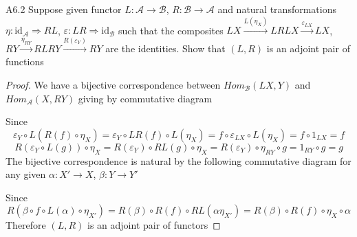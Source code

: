 \documentclass[../main.tex]{subfiles}
\begin{document}
\begin{customexercise}{A6.2}
Suppose given functor $L:\mathcal{A}\to\mathcal{B}$, $R:\mathcal{B}\to\mathcal{A}$ and natural transformations $\eta:\mathrm{id}_{\mathcal A}\Rightarrow RL$, $\varepsilon:LR\Rightarrow\mathrm{id}_{\mathcal B}$ such that the composites $LX\xrightarrow{L(\eta_X)}LRLX\xrightarrow{\varepsilon_{LX}}LX$, $RY\xrightarrow{\eta_{RY}}RLRY\xrightarrow{R(\varepsilon_Y)}RY$ are the identities. Show that $(L,R)$ is an adjoint pair of functions
\end{customexercise}

\begin{proof}
We have a bijective correspondence between $Hom_{\mathscr B}(LX,Y)$ and $Hom_{\mathscr A}(X,RY)$ giving by commutative diagram
\begin{center}
\end{center}
Since
\[\varepsilon_Y\circ L(R(f)\circ\eta_X)=\varepsilon_Y\circ LR(f)\circ L(\eta_X)=f\circ\varepsilon_{LX}\circ L(\eta_X)=f\circ1_{LX}=f\]
\[R(\varepsilon_Y\circ L(g))\circ\eta_X=R(\varepsilon_Y)\circ RL(g)\circ\eta_X=R(\varepsilon_Y)\circ\eta_{RY}\circ g=1_{RY}\circ g=g\]
The bijective correspondence is natural by the following commutative diagram for any given $\alpha:X'\to X$, $\beta:Y\to Y'$
\begin{center}
\end{center}
Since
\[R(\beta\circ f\circ L(\alpha)\circ\eta_{X'})=R(\beta)\circ R(f)\circ RL(\alpha\eta_{X'})=R(\beta)\circ R(f)\circ\eta_X\circ\alpha\]
Therefore $(L,R)$ is an adjoint pair of functors
\end{proof}
\end{document}
